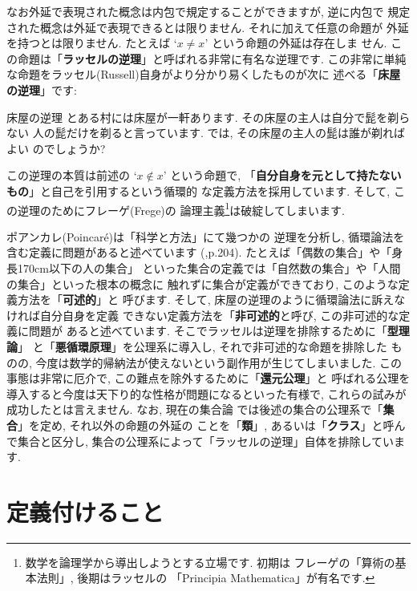 なお外延で表現された概念は内包で規定することができますが, 逆に内包で
規定された概念は外延で表現できるとは限りません. それに加えて任意の命題が
外延を持つとは限りません. たとえば `$x \neq x$' という命題の外延は存在しま
せん. この命題は「\textbf{ラッセルの逆理}」と呼ばれる非常に有名な逆理です.
 この非常に単純な命題をラッセル(Russell)自身がより分かり易くしたものが次に
述べる「\textbf{床屋の逆理}」です:

\begin{itembox}[c]{{床屋の逆理}}
\quad とある村には床屋が一軒あります. その床屋の主人は自分で髭を剃らない
人の髭だけを剃ると言っています. では, その床屋の主人の髭は誰が剃ればよい
のでしょうか?
\end{itembox}

この逆理の本質は前述の `$x \notin x$' という命題で, 
「\textbf{自分自身を元として持たないもの}」と自己を引用するという循環的
な定義方法を採用しています. そして, この逆理のためにフレーゲ(Frege)の
論理主義\footnote{数学を論理学から導出しようとする立場です. 初期は
フレーゲの「算術の基本法則」\cite{フレーゲ}, 後期はラッセルの
「Principia Mathematica」\cite{Russell}が有名です.}は破綻してしまいます.
\newline


ポアンカレ(Poincar\'e)は「科学と方法」\cite{ポアンカレ}にて幾つかの
逆理を分析し, 循環論法を含む定義に問題があると述べています
(\cite{ポアンカレ},p.204). たとえば「偶数の集合」や「身長170cm以下の人の集合」
といった集合の定義では「自然数の集合」や「人間の集合」といった根本の概念に
触れずに集合が定義ができており, このような定義方法を「\textbf{可述的}」と
呼びます. そして, 床屋の逆理のように循環論法に訴えなければ自分自身を定義
できない定義方法を「\textbf{非可述的}と呼び, この非可述的な定義に問題が
あると述べています. そこでラッセルは逆理を排除するために「\textbf{型理論}」
と「\textbf{悪循環原理}」を公理系に導入し, それで非可述的な命題を排除した
ものの, 今度は数学的帰納法が使えないという副作用が生じてしまいました.
 この事態は非常に厄介で, この難点を除外するために「\textbf{還元公理}」と
呼ばれる公理を導入すると今度は天下り的な性格が問題になるといった有様で,
 これらの試みが成功したとは言えません\cite{Russell}. なお, 現在の集合論
では後述の集合の公理系で「\textbf{集合}」を定め, それ以外の命題の外延の
ことを「\textbf{類}」, あるいは「\textbf{クラス}」と呼んで集合と区分し,
 集合の公理系によって「ラッセルの逆理」自体を排除しています.

\section{定義付けること}

